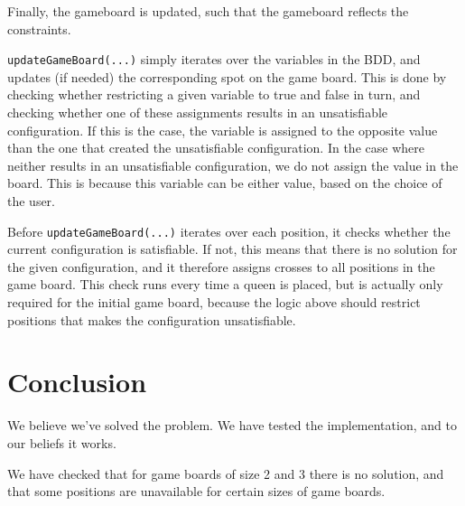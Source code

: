 Finally, the gameboard is updated, such that the gameboard reflects the constraints.

\newpar\texttt{updateGameBoard(...)} simply iterates over the variables in the BDD, and updates (if needed) the corresponding spot on the game board. This is done by checking whether restricting a given variable to true and false in turn, and checking whether one of these assignments results in an unsatisfiable configuration. If this is the case, the variable is assigned to the opposite value than the one that created the unsatisfiable configuration. In the case where neither results in an unsatisfiable configuration, we do not assign the value in the board. This is because this variable can be either value, based on the choice of the user.

\newpar Before \texttt{updateGameBoard(...)} iterates over each position, it checks whether the current configuration is satisfiable. If not, this means that there is no solution for the given configuration, and it therefore assigns crosses to all positions in the game board. This check runs every time a queen is placed, but is actually only required for the initial game board, because the logic above should restrict positions that makes the configuration unsatisfiable.

\section{Conclusion}
We believe we've solved the problem. We have tested the implementation, and to our beliefs it works.

\newpar We have checked that for game boards of size 2 and 3 there is no solution, and that some positions are unavailable for certain sizes of game boards.